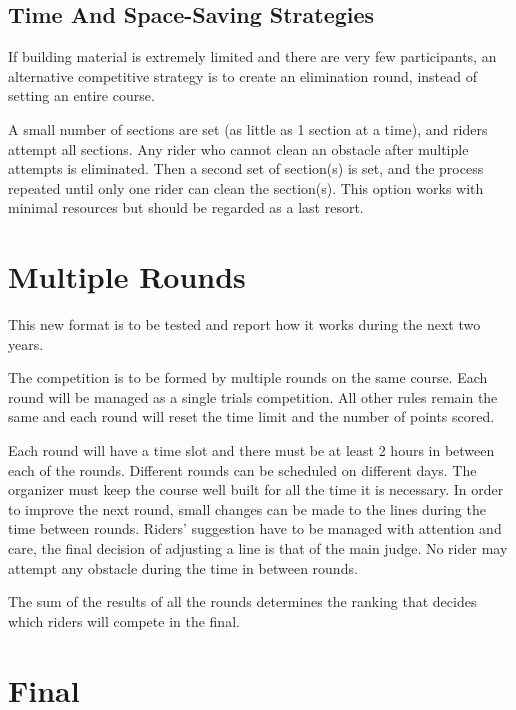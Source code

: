 \subsection{Time And Space-Saving Strategies}
If building material is extremely limited and there are very few participants, an alternative competitive strategy is to create an elimination round, instead of setting an entire course.

A small number of sections are set (as little as 1 section at a time), and riders attempt all sections.
Any rider who cannot clean an obstacle after multiple attempts is eliminated.
Then a second set of section(s) is set, and the process repeated until only one rider can clean the section(s).
This option works with minimal resources but should be regarded as a last resort.

\section{Multiple Rounds}
This new format is to be tested and report how it works during the next two years.

The competition is to be formed by multiple rounds on the same course.
Each round will be managed as a single trials competition.
All other rules remain the same and each round will reset the time limit and the number of points scored.

Each round will have a time slot and there must be at least 2 hours in between each of the rounds.
Different rounds can be scheduled on different days.
The organizer must keep the course well built for all the time it is necessary.
In order to improve the next round, small changes can be made to the lines during the time between rounds.
Riders' suggestion have to be managed with attention and care, the final decision of adjusting a line is that of the main judge.
No rider may attempt any obstacle during the time in between rounds.

The sum of the results of all the rounds determines the ranking that decides which riders will compete in the final.

\subsection{}

\section{Final}

